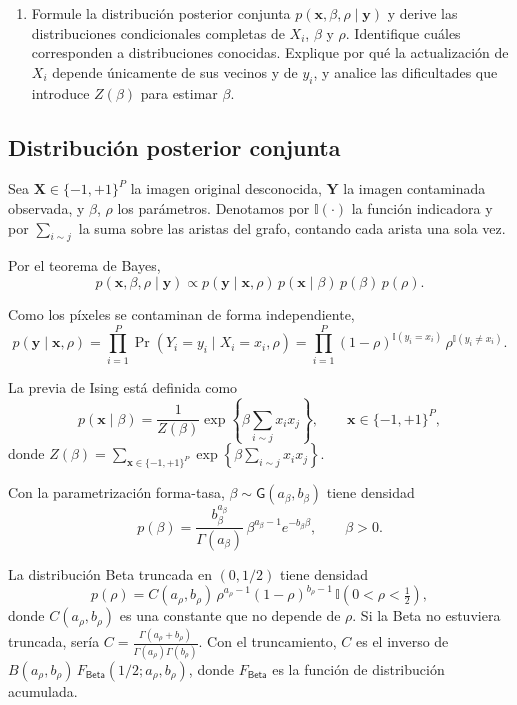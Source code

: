 \documentclass[11pt,a4paper]{article}
\begin{document}
\begin{enumerate}[label=\arabic*.]
    \item Formule la distribución posterior conjunta $p(\boldsymbol{x}, \beta, \rho \mid \boldsymbol{y})$ y derive las distribuciones condicionales completas de $X_i$, $\beta$ y $\rho$. Identifique cuáles corresponden a distribuciones conocidas. Explique por qué la actualización de $X_i$ depende únicamente de sus vecinos y de $y_i$, y analice las dificultades que introduce $Z(\beta)$ para estimar $\beta$.
\end{enumerate}

\subsection{Distribución posterior conjunta}

Sea $\boldsymbol{X} \in \{-1,+1\}^P$ la imagen original desconocida, $\boldsymbol{Y}$ la imagen contaminada observada, y $\beta$, $\rho$ los parámetros. Denotamos por $\mathbb{I}(\cdot)$ la función indicadora y por $\sum_{i\sim j}$ la suma sobre las aristas del grafo, contando cada arista una sola vez.

Por el teorema de Bayes,
\[
p(\boldsymbol{x}, \beta, \rho \mid \boldsymbol{y}) \propto p(\boldsymbol{y} \mid \boldsymbol{x}, \rho)\, p(\boldsymbol{x} \mid \beta)\, p(\beta)\, p(\rho).
\]

Como los píxeles se contaminan de forma independiente,
\[
p(\boldsymbol{y} \mid \boldsymbol{x}, \rho) = \prod_{i=1}^{P} \Pr(Y_i = y_i \mid X_i = x_i, \rho) = \prod_{i=1}^{P} (1-\rho)^{\mathbb{I}(y_i = x_i)}\, \rho^{\mathbb{I}(y_i \neq x_i)}.
\]

La previa de Ising está definida como
\[
p(\boldsymbol{x} \mid \beta) = \frac{1}{Z(\beta)} \exp\left\{ \beta \sum_{i \sim j} x_i x_j \right\}, \qquad \boldsymbol{x} \in \{-1,+1\}^P,
\]
donde $Z(\beta) = \sum_{\boldsymbol{x} \in \{-1,+1\}^P} \exp\left\{ \beta \sum_{i \sim j} x_i x_j \right\}$.

Con la parametrización forma-tasa, $\beta \sim \textsf{G}(a_\beta, b_\beta)$ tiene densidad
\[
p(\beta) = \frac{b_\beta^{a_\beta}}{\Gamma(a_\beta)}\, \beta^{a_\beta - 1} e^{-b_\beta \beta}, \qquad \beta > 0.
\]

La distribución Beta truncada en $(0, 1/2)$ tiene densidad
\[
p(\rho) = C(a_\rho, b_\rho)\, \rho^{a_\rho - 1} (1-\rho)^{b_\rho - 1}\, \mathbb{I}\left(0 < \rho < \tfrac{1}{2}\right),
\]
donde $C(a_\rho, b_\rho)$ es una constante que no depende de $\rho$. Si la Beta no estuviera truncada, sería $C = \frac{\Gamma(a_\rho + b_\rho)}{\Gamma(a_\rho)\Gamma(b_\rho)}$. Con el truncamiento, $C$ es el inverso de $B(a_\rho, b_\rho)\, F_{\textsf{Beta}}(1/2; a_\rho, b_\rho)$, donde $F_{\textsf{Beta}}$ es la función de distribución acumulada.
\end{document}
